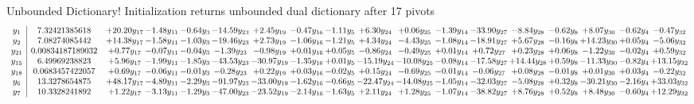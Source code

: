 \documentclass[9pt]{article}
\begin{document}
Unbounded Dictionary!
Initialization returns unbounded dual dictionary after 17 pivots
\[\begin{array}{c| c c@{\hskip 2pt} c@{\hskip 2pt} c@{\hskip 2pt} c@{\hskip 2pt} c@{\hskip 2pt} c@{\hskip 2pt} c@{\hskip 2pt} c@{\hskip 2pt} c@{\hskip 2pt} c@{\hskip 2pt} c@{\hskip 2pt} c@{\hskip 2pt} c@{\hskip 2pt} c@{\hskip 2pt} c@{\hskip 2pt} c@{\hskip 2pt} }
 y_{1}   &  7.32421385618 & + 20.20 y_{17} & -1.48 y_{11} & -0.64 y_{3} & -14.59 y_{23} & +  2.45 y_{19} & -0.47 y_{16} & -1.11 y_{5} & +  6.30 y_{24} & +  0.06 y_{25} & -1.39 y_{14} & -33.90 y_{27} & -8.84 y_{28} & -0.62 y_{8} & +  8.07 y_{30} & -0.62 y_{4} & -0.47 y_{32}\\
 y_{2}   &  7.08274085442 & + 14.38 y_{17} & -1.58 y_{11} & -1.03 y_{3} & -19.46 y_{23} & +  2.73 y_{19} & -1.06 y_{16} & -1.21 y_{5} & +  4.34 y_{24} & -4.43 y_{25} & -1.08 y_{14} & -18.91 y_{27} & +  5.67 y_{28} & -0.16 y_{8} & + 14.23 y_{30} & +  0.05 y_{4} & -5.06 y_{32}\\
 y_{21}   &  0.00834187189032 & +  0.77 y_{17} & -0.07 y_{11} & -0.04 y_{3} & -1.39 y_{23} & -0.98 y_{19} & +  0.01 y_{16} & +  0.05 y_{5} & -0.86 y_{24} & -0.49 y_{25} & +  0.01 y_{14} & +  0.72 y_{27} & +  0.23 y_{28} & +  0.06 y_{8} & -1.22 y_{30} & -0.02 y_{4} & +  0.59 y_{32}\\
 y_{15}   &  6.49969238823 & +  5.96 y_{17} & -1.99 y_{11} & -1.85 y_{3} & -43.53 y_{23} & -30.97 y_{19} & -1.35 y_{16} & +  0.01 y_{5} & -15.19 y_{24} & -10.08 y_{25} & -0.08 y_{14} & -17.58 y_{27} & + 14.44 y_{28} & +  0.59 y_{8} & -11.33 y_{30} & -0.82 y_{4} & + 13.15 y_{32}\\
 y_{18}   &  0.0683457422057 & +  0.69 y_{17} & -0.06 y_{11} & -0.01 y_{3} & -0.28 y_{23} & +  0.22 y_{19} & +  0.03 y_{16} & -0.02 y_{5} & +  0.15 y_{24} & -0.69 y_{25} & -0.01 y_{14} & -0.06 y_{27} & +  0.08 y_{28} & -0.01 y_{8} & +  0.01 y_{30} & +  0.03 y_{4} & -0.22 y_{32}\\
 y_{6}   &  13.3278654875 & + 48.17 y_{17} & -4.89 y_{11} & -2.29 y_{3} & -91.97 y_{23} & -33.00 y_{19} & -1.62 y_{16} & -0.66 y_{5} & -22.47 y_{24} & -14.08 y_{25} & -1.05 y_{14} & -32.03 y_{27} & -5.08 y_{28} & +  0.32 y_{8} & -30.21 y_{30} & -2.16 y_{4} & + 33.03 y_{32}\\
 y_{7}   &  10.3328241892 & +  1.22 y_{17} & -3.13 y_{11} & -1.29 y_{3} & -47.00 y_{23} & -23.52 y_{19} & -2.14 y_{16} & -1.63 y_{5} & +  2.11 y_{24} & +  1.28 y_{25} & -1.07 y_{14} & -38.82 y_{27} & +  8.76 y_{28} & +  0.52 y_{8} & +  8.48 y_{30} & -0.60 y_{4} & + 12.29 y_{32}\\

\end{array}\]
\end{document}
